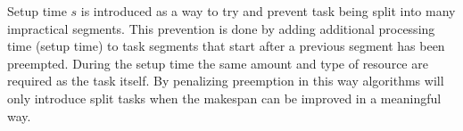 Setup time \(s\) is introduced as a way to try and prevent task being split into many impractical segments. This prevention is done by adding additional processing time (setup time) to task segments that start after a previous segment has been preempted. During the setup time the same amount and type of resource are required as the task itself. By penalizing preemption in this way algorithms will only introduce split tasks when the makespan can be improved in a meaningful way.